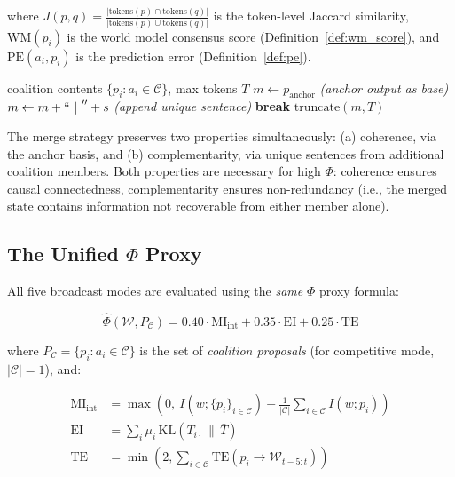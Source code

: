 \documentclass[11pt]{article}
\theoremstyle{definition}
\begin{document}
where $J(p, q) = \frac{|\text{tokens}(p) \cap \text{tokens}(q)|}{|\text{tokens}(p) \cup \text{tokens}(q)|}$
is the token-level Jaccard similarity, $\text{WM}(p_i)$ is the world model consensus score
(Definition~\ref{def:wm_score}), and $\text{PE}(a_i, p_i)$ is the prediction error
(Definition~\ref{def:pe}).

\begin{algorithm}[h]
\caption{Coalition Merge}
\label{alg:merge}
\begin{algorithmic}[1]
\Require coalition contents $\{p_i : a_i \in \mathcal{C}\}$, max tokens $T$
\State $m \gets p_{\text{anchor}}$ \quad \textit{(anchor output as base)}
      \State $m \gets m + ``\text{ | }'' + s$ \quad \textit{(append unique sentence)}
      \State \textbf{break}
    \EndIf
  \EndFor
\EndFor
\State \Return $\text{truncate}(m, T)$
\end{algorithmic}
\end{algorithm}

The merge strategy preserves two properties simultaneously: (a) coherence, via the anchor
basis, and (b) complementarity, via unique sentences from additional coalition members. Both
properties are necessary for high $\Phi$: coherence ensures causal connectedness, complementarity
ensures non-redundancy (i.e., the merged state contains information not recoverable from either
member alone).

\subsection{The Unified $\Phi$ Proxy}
\label{sec:phi}

All five broadcast modes are evaluated using the \emph{same} $\Phi$ proxy formula:

\begin{equation}
\hat{\Phi}(\mathcal{W}, P_{\mathcal{C}}) =
  0.40 \cdot \text{MI}_{\text{int}} + 0.35 \cdot \text{EI} + 0.25 \cdot \text{TE}
\label{eq:phi}
\end{equation}

where $P_{\mathcal{C}} = \{p_i : a_i \in \mathcal{C}\}$ is the set of \emph{coalition proposals}
(for competitive mode, $|\mathcal{C}| = 1$), and:

\begin{align}
\text{MI}_{\text{int}} &= \max\left(0,\ I(w; \{p_i\}_{i \in \mathcal{C}}) -
  \frac{1}{|\mathcal{C}|}\sum_{i \in \mathcal{C}} I(w; p_i)\right) \label{eq:mi}\\
\text{EI} &= \sum_{i} \mu_i\, \text{KL}\!\left(T_{i\cdot} \,\|\, \bar{T}\right) \label{eq:ei}\\
\text{TE} &= \min\!\left(2, \sum_{i \in \mathcal{C}} \text{TE}(p_i \to \mathcal{W}_{t-5:t})\right)
\label{eq:te}
\end{align}
\end{document}
